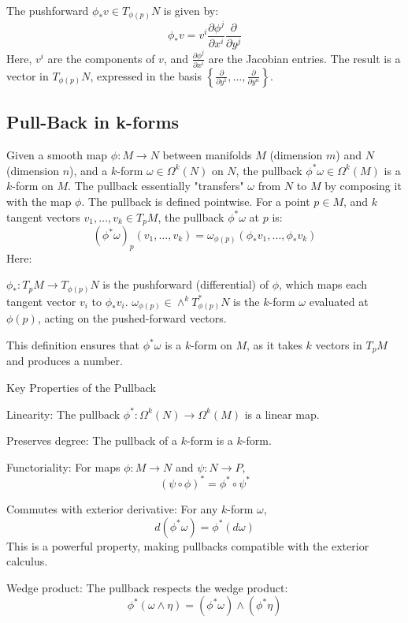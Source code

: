 The pushforward $ \phi_* v \in T_{\phi(p)} N $ is given by:
$$\phi_* v = v^i \frac{\partial \phi^j}{\partial x^i} \frac{\partial}{\partial y^j}$$
Here, $ v^i $ are the components of $ v $, and $ \frac{\partial \phi^j}{\partial x^i} $ are the Jacobian entries. The result is a vector in $ T_{\phi(p)} N $, expressed in the basis $ \left\{ \frac{\partial}{\partial y^1}, \dots, \frac{\partial}{\partial y^n} \right\} $.

\subsection{Pull-Back in k-forms}
Given a smooth map $ \phi: M \to N $ between manifolds $ M $ (dimension $ m $) and $ N $ (dimension $ n $), and a $ k $-form $ \omega \in \Omega^k(N) $ on $ N $, the pullback $ \phi^* \omega \in \Omega^k(M) $ is a $ k $-form on $ M $. The pullback essentially "transfers" $ \omega $ from $ N $ to $ M $ by composing it with the map $ \phi $.
The pullback is defined pointwise. For a point $ p \in M $, and $ k $ tangent vectors $ v_1, \dots, v_k \in T_p M $, the pullback $ \phi^* \omega $ at $ p $ is:
$$(\phi^* \omega)_p (v_1, \dots, v_k) = \omega_{\phi(p)} (\phi_* v_1, \dots, \phi_* v_k)$$
Here:

$ \phi_*: T_p M \to T_{\phi(p)} N $ is the pushforward (differential) of $ \phi $, which maps each tangent vector $ v_i $ to $ \phi_* v_i $.
$ \omega_{\phi(p)} \in \wedge^k T_{\phi(p)}^* N $ is the $ k $-form $ \omega $ evaluated at $ \phi(p) $, acting on the pushed-forward vectors.

This definition ensures that $ \phi^* \omega $ is a $ k $-form on $ M $, as it takes $ k $ vectors in $ T_p M $ and produces a number.

Key Properties of the Pullback

Linearity: The pullback $ \phi^*: \Omega^k(N) \to \Omega^k(M) $ is a linear map.

Preserves degree: The pullback of a $ k $-form is a $ k $-form.

Functoriality: For maps $ \phi: M \to N $ and $ \psi: N \to P $,
$$(\psi \circ \phi)^* = \phi^* \circ \psi^*$$

Commutes with exterior derivative: For any $ k $-form $ \omega $,
$$d (\phi^* \omega) = \phi^* (d \omega)$$
This is a powerful property, making pullbacks compatible with the exterior calculus.

Wedge product: The pullback respects the wedge product:
$$\phi^* (\omega \wedge \eta) = (\phi^* \omega) \wedge (\phi^* \eta)$$



